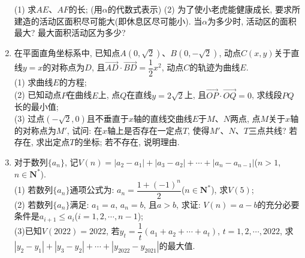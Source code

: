 \documentclass[10pt,a4paper]{article}
\begin{document}
\begin{enumerate}[1.]
\begin{center}
\end{center}
(1) 求$AE$、$AF$的长; (用$\alpha$的代数式表示)
(2) 为了使小老虎能健康成长, 要求所建造的活动区面积尽可能大(即休息区尽可能小). 当$\alpha$为多少时, 活动区的面积最大? 最大面积活动区为多少?
\item 在平面直角坐标系中, 已知点$A(0,\sqrt 2)$、$B(0,-\sqrt 2)$, 动点$C(x,y)$关于直线$y=x$的对称点为$D$, 且$\overrightarrow{AD}\cdot \overrightarrow{BD}=\dfrac 12{x^2}$, 动点$C$的轨迹为曲线$E$.\\
(1) 求曲线$E$的方程;\\
(2) 已知动点$P$在曲线$E$上, 点$Q$在直线$y=2\sqrt 2$上, 且$\overrightarrow{OP}\cdot \overrightarrow{OQ}=0$, 求线段$PQ$长的最小值;\\
(3) 过点$(-\sqrt 2,0)$且不垂直于$x$轴的直线交曲线$E$于$M$、$N$两点, 点$M$关于$x$轴的对称点为$M'$, 试问: 在$x$轴上是否存在一定点$T$, 使得$M'$、$N$、$T$三点共线? 若存在, 求出定点$T$的坐标; 若不存在, 说明理由.
\item 对于数列$\{a_n\}$, 记$V(n)=|a_2-a_1|+|a_3-a_2|+\cdots +|a_n-a_{n-1}|$($n>1$, $n\in \mathbf{N}^*$).\\
(1) 若数列$\{a_n\}$通项公式为: $a_n=\dfrac{1+(-1)^n}2$($n\in \mathbf{N}^*$), 求$V(5)$;\\
(2) 若数列$\{a_n\}$满足: $a_1=a$, $a_n=b$, 且$a>b$, 求证: $V(n)=a-b$的充分必要条件是$a_{i+1}\le a_i$($i=1,2,\cdots,n-1$);\\
(3)已知$V(2022)=2022$, 若$y_t=\dfrac 1t(a_1+a_2+\cdots +a_t)$, $t=1,2,\cdots,2022$, 求$|y_2-y_1|+|y_3-y_2|+\cdots +|y_{2022}-y_{2021}|$的最大值.



\end{enumerate}
\end{document}
